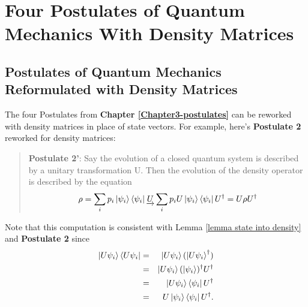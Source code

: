 
\chapter{Four Postulates of Quantum Mechanics With Density Matrices} %

\label{AppendixA} %
\section{Postulates of Quantum Mechanics Reformulated with Density Matrices}



The four Postulates from \textbf{Chapter \ref{Chapter3-postulates}} can be reworked with density matrices in place of state vectors. For example, here's \textbf{Postulate 2} reworked for density matrices:
\begin{quote}
    {\bf{Postulate 2'}}: Say the evolution of a closed quantum system is described by a unitary transformation U. Then the evolution of the density operator is described by the equation
    \begin{equation}
        \rho=\sum_i p_i \ket{\psi_i}\bra{\psi_i}	\underrightarrow{U}\sum_i p_i U \ket{\psi_i}\bra{\psi_i}U^\dagger=U \rho U^\dagger
    \end{equation}
\end{quote}

Note that this computation is consistent with Lemma \ref{lemma state into density} and {\bf{Postulate 2}} since
\begin{eqnarray}
\ket{U \psi_i}\bra{U \psi_i}&=& \ket{U \psi_i}(\ket{U \psi_i}^\dagger)\\
&=& \ket{U\psi_i}(\ket{\psi_i})^\dagger U^\dagger\\
&=& \ket{U \psi_i} \bra{\psi_i}U^\dagger\\
&=& U \ket{\psi_i}\bra{\psi_i}U^\dagger.
\end{eqnarray}

